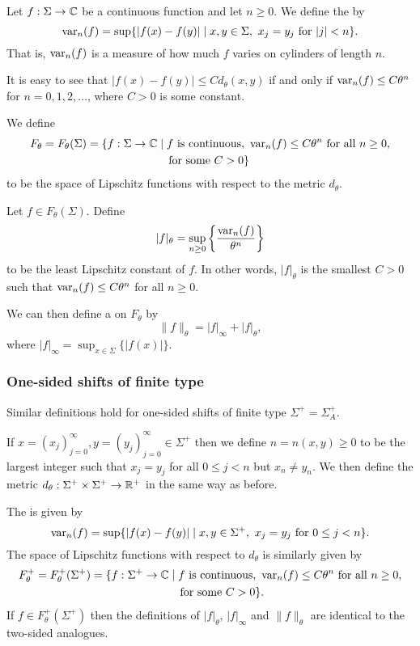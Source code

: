 Let $f : \Sigma \to \mathbb{C}$ be a continuous function and let $n \geq 0$. We define the  by
\[
	\operatorname{var}_n(f) = \sup\{|f(x) - f(y)| \mid x, y \in \Sigma,\ x_j = y_j \text{ for } |j| < n\}.
\]
That is, $\operatorname{var}_n(f)$ is a measure of how much $f$ varies on cylinders of length $n$.~\cite[Lecture 8]{magic-ergodic}

It is easy to see that $|f(x) - f(y)| \leq Cd_\theta(x, y)$ if and only if $\operatorname{var}_n(f) \leq C\theta^n$ for $n = 0, 1, 2, \dots$, where $C > 0$ is some constant.

We define
\begin{align*}
	F_\theta = F_\theta(\Sigma) = \{f : \Sigma \to \mathbb{C} &\mid f \text{ is continuous}, \ \operatorname{var}_n(f) \leq C\theta^n \text{ for all } n \geq 0, \\
			& \quad \text{for some } C > 0\}
\end{align*}
to be the space of Lipschitz functions with respect to the metric $d_\theta$.

Let $f \in F_\theta(\Sigma)$. Define
\[
	|f|_\theta = \sup_{n \geq 0}\left\{\frac{\operatorname{var}_n(f)}{\theta^n}\right\}
\]
to be the least Lipschitz constant of $f$. In other words, $|f|_\theta$ is the smallest $C > 0$ such that $\operatorname{var}_n(f) \leq C\theta^n$ for all $n \geq 0$.

We can then define a  on $F_\theta$ by
\[
	\|f\|_\theta = |f|_\infty+ |f|_\theta,
\]
where $|f|_\infty = \sup_{x \in \Sigma}\{|f(x)|\}$.

\subsubsection{One-sided shifts of finite type}
Similar definitions hold for one-sided shifts of finite type $\Sigma^+ = \Sigma_A^+$.

If $x = (x_j)_{j = 0}^\infty, y = (y_j)_{j = 0}^\infty \in \Sigma^+$ then we define $n = n(x, y) \geq 0$ to be the largest integer such that $x_j = y_j$ for all $0 \leq j < n$ but $x_n \neq y_n$. We then define the metric $d_\theta : \Sigma^+ \times \Sigma^+ \to \mathbb{R}^+$ in the same way as before.

The  is given by
\[
	\operatorname{var}_n(f) = \sup\{|f(x) - f(y)| \mid x, y \in \Sigma^+,\ x_j = y_j \text{ for } 0 \leq j < n\}.
\]
The space of Lipschitz functions with respect to $d_\theta$ is similarly given by
\begin{align*}
	F_\theta^+ = F_\theta^+(\Sigma^+) = \{f : \Sigma^+ \to \mathbb{C} &\mid f \text{ is continuous}, \ \operatorname{var}_n(f) \leq C\theta^n \text{ for all } n \geq 0, \\
			& \quad \text{for some } C > 0\}.
\end{align*}
If $f \in F_\theta^+(\Sigma^+)$ then the definitions of $|f|_\theta$, $|f|_\infty$ and $\|f\|_\theta$ are identical to the two-sided analogues.

